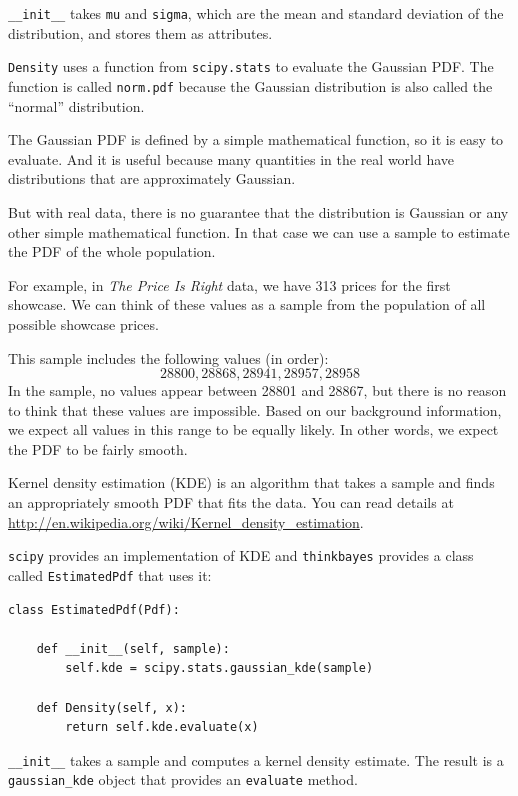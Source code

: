 \documentclass[12pt]{book}
\begin{document}
\verb"__init__" takes {\tt mu} and {\tt sigma}, which are
the mean and standard deviation of the distribution, and stores
them as attributes.

{\tt Density} uses a function from {\tt scipy.stats} to evaluate the
Gaussian PDF.  The function is called {\tt norm.pdf} because the
Gaussian distribution is also called the ``normal'' distribution. 

The Gaussian PDF is defined by a simple mathematical function,
so it is easy to evaluate.  And it is useful because many
quantities in the real world have distributions that are
approximately Gaussian.

But with real data, there is no guarantee that the distribution
is Gaussian or any other simple mathematical function.  In
that case we can use a sample to estimate the PDF of
the whole population.

For example, in {\it The Price Is Right} data, we have
313 prices for the first showcase.  We can think of these
values as a sample from the population of all possible showcase
prices.

This sample includes the following values (in order):
%
\[ 28800, 28868, 28941, 28957, 28958 \]
%
In the sample, no values appear between 28801 and 28867, but
there is no reason to think that these values are impossible.
Based on our background information, we expect all
values in this range to be equally likely.  In other words,
we expect the PDF to be fairly smooth.

Kernel density estimation (KDE) is an algorithm that takes
a sample and finds an appropriately smooth PDF that fits 
the data.  You can read details at
\url{http://en.wikipedia.org/wiki/Kernel_density_estimation}.

{\tt scipy} provides an implementation of KDE and  {\tt thinkbayes}
provides a class called {\tt EstimatedPdf} that 
uses it:

\begin{verbatim}
class EstimatedPdf(Pdf):

    def __init__(self, sample):
        self.kde = scipy.stats.gaussian_kde(sample)

    def Density(self, x):
        return self.kde.evaluate(x)
\end{verbatim}

\verb"__init__" takes a sample
and computes a kernel density estimate.  The result is a
\verb"gaussian_kde" object that provides an {\tt evaluate}
method.
\end{document}
